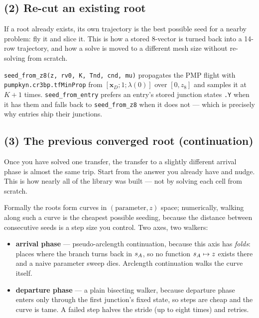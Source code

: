 \documentclass[11pt]{article}
\newcommand{\file}[1]{\texttt{#1}}
\begin{document}
\subsection{(2) Re-cut an existing root}

\begin{intu}
If a root already exists, its own trajectory is the best possible seed for a
nearby problem: fly it and slice it. This is how a stored 8-vector is turned
back into a 14-row trajectory, and how a solve is moved to a different mesh
size without re-solving from scratch.
\end{intu}

\begin{rig}
\file{seed\_from\_z8(z, rv0, K, Tnd, cnd, mu)} propagates the PMP flight with
\file{pumpkyn.cr3bp.tfMinProp} from $[\bm x_D;1;\lambda(0)]$ over $[0,z_8]$
and samples it at $K{+}1$ times. \file{seed\_from\_entry} prefers an entry's
stored junction states \file{.Y} when it has them and falls back to
\file{seed\_from\_z8} when it does not --- which is precisely why entries
ship their junctions.
\end{rig}

\subsection{(3) The previous converged root (continuation)}

\begin{eli}
Once you have solved one transfer, the transfer to a slightly different
arrival phase is almost the same trip. Start from the answer you already have
and nudge. This is how nearly all of the library was built --- not by solving
each cell from scratch.
\end{eli}

\begin{intu}
Formally the roots form curves in $(\text{parameter}, z)$ space; numerically,
walking along such a curve is the cheapest possible seeding, because the
distance between consecutive seeds is a step size you control. Two axes, two
walkers:
\begin{itemize}[nosep]
\item \textbf{arrival phase} --- pseudo-arclength continuation, because this
      axis has \emph{folds}: places where the branch turns back in $s_A$, so
      no function $s_A\mapsto z$ exists there and a naive parameter sweep
      dies. Arclength continuation walks the curve itself.
\item \textbf{departure phase} --- a plain bisecting walker, because
      departure phase enters only through the first junction's fixed state,
      so steps are cheap and the curve is tame. A failed step halves the
      stride (up to eight times) and retries.
\end{itemize}
\end{intu}
\end{document}
